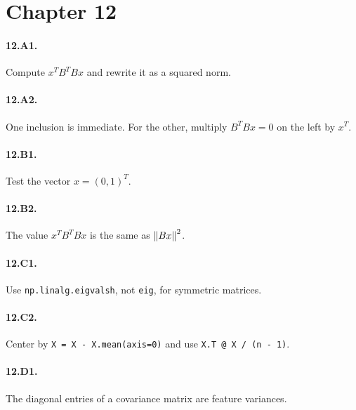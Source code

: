 \section*{Chapter 12}
\paragraph{12.A1.} Compute $x^TB^TBx$ and rewrite it as a squared norm.
\paragraph{12.A2.} One inclusion is immediate. For the other, multiply
$B^TBx=0$ on the left by $x^T$.
\paragraph{12.B1.} Test the vector $x=(0,1)^T$.
\paragraph{12.B2.} The value $x^TB^TBx$ is the same as $\left\lVert Bx \right\rVert^2$.
\paragraph{12.C1.} Use \texttt{np.linalg.eigvalsh}, not \texttt{eig}, for
symmetric matrices.
\paragraph{12.C2.} Center by \texttt{X = X - X.mean(axis=0)} and use
\texttt{X.T @ X / (n - 1)}.
\paragraph{12.D1.} The diagonal entries of a covariance matrix are feature
variances.
